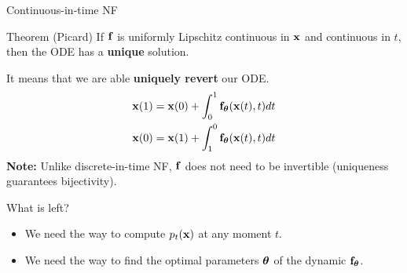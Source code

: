 \begin{frame}{Continuous-in-time NF}
	\begin{block}{Theorem (Picard)}
		If $\mathbf{f}$ is uniformly Lipschitz continuous in $\mathbf{x}$ and continuous in $t$, then the ODE has a \textbf{unique} solution.
	\end{block}
	It means that we are able \textbf{uniquely revert} our ODE. 
	\begin{align*}
		\mathbf{x}(1) &= \mathbf{x}(0) + \int_{0}^{1} \mathbf{f}_{\boldsymbol{\theta}}(\mathbf{x}(t), t) dt \\
		\mathbf{x}(0) &= \mathbf{x}(1) + \int_{1}^{0} \mathbf{f}_{\boldsymbol{\theta}}(\mathbf{x}(t), t) dt
	\end{align*}
	\textbf{Note:} Unlike discrete-in-time NF, $\mathbf{f}$ does not need to be invertible (uniqueness guarantees bijectivity).
	\begin{block}{What is left?}
		\begin{itemize}
			\item We need the way to compute $p_t(\mathbf{x})$ at any moment $t$.
			\item We need the way to find the optimal parameters $\boldsymbol{\theta}$ of the dynamic $\mathbf{f}_{\boldsymbol{\theta}}$.
		\end{itemize}
	\end{block}
\end{frame}

